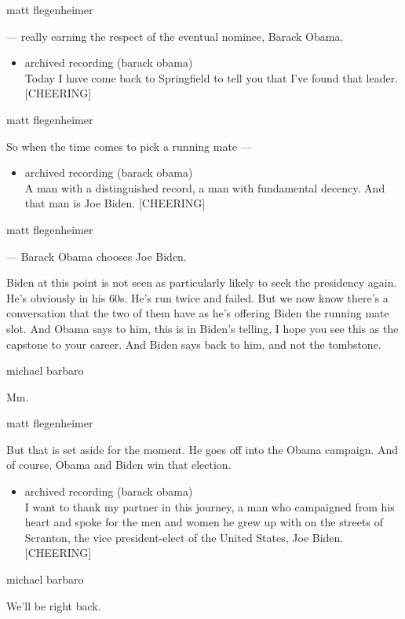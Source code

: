 matt flegenheimer

--- really earning the respect of the eventual nominee, Barack Obama.

\begin{itemize}
\tightlist
\item
  archived recording (barack obama)\\
  Today I have come back to Springfield to tell you that I've found that
  leader. {[}CHEERING{]}
\end{itemize}

matt flegenheimer

So when the time comes to pick a running mate ---

\begin{itemize}
\tightlist
\item
  archived recording (barack obama)\\
  A man with a distinguished record, a man with fundamental decency. And
  that man is Joe Biden. {[}CHEERING{]}
\end{itemize}

matt flegenheimer

--- Barack Obama chooses Joe Biden.

Biden at this point is not seen as particularly likely to seek the
presidency again. He's obviously in his 60s. He's run twice and failed.
But we now know there's a conversation that the two of them have as he's
offering Biden the running mate slot. And Obama says to him, this is in
Biden's telling, I hope you see this as the capstone to your career. And
Biden says back to him, and not the tombstone.

michael barbaro

Mm.

matt flegenheimer

But that is set aside for the moment. He goes off into the Obama
campaign. And of course, Obama and Biden win that election.

\begin{itemize}
\tightlist
\item
  archived recording (barack obama)\\
  I want to thank my partner in this journey, a man who campaigned from
  his heart and spoke for the men and women he grew up with on the
  streets of Scranton, the vice president-elect of the United States,
  Joe Biden. {[}CHEERING{]}
\end{itemize}

michael barbaro

We'll be right back.

